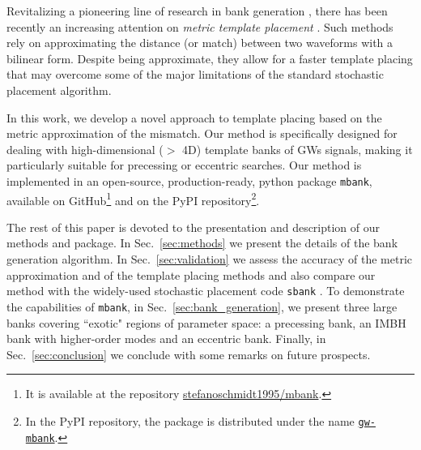 \documentclass[twocolumn,showpacs,preprintnumbers,nofootinbib,prd,
superscriptaddress,10pt]{revtex4-2}
\begin{document}
Revitalizing a pioneering line of research in bank generation \cite{owen_metric, Messenger:2008ta, Prix:2007ks, Brown:2012qf, Keppel:2013uma}, there has been recently an increasing attention on {\it metric template placement} \cite{Roy:2017oul, 2018cosp...42E2899R, Coogan:2022qxs, Hanna:2022zpk}.
Such methods rely on approximating the distance (or match) between two waveforms with a bilinear form. Despite being approximate, they allow for a faster template placing that may overcome some of the major limitations of the standard stochastic placement algorithm.

In this work, we develop a novel approach to template placing based on the metric approximation of the mismatch.
Our method is specifically designed for dealing with high-dimensional ($>$ 4D) template banks of GWs signals, making it particularly suitable for precessing or eccentric searches.
Our method is implemented in an open-source, production-ready, python package \texttt{mbank}, available on GitHub\footnote{
It is available at the repository \href{https://github.com/stefanoschmidt1995/mbank}{stefanoschmidt1995/mbank}.}
and on the PyPI repository\footnote{
In the PyPI repository, the package is distributed under the name \texttt{\href{https://pypi.org/project/gw-mbank/}{gw-mbank}}.
}.


The rest of this paper is devoted to the presentation and description of our methods and package.
In Sec.~\ref{sec:methods} we present the details of the bank generation algorithm.
In Sec.~\ref{sec:validation} we assess the accuracy of the metric approximation and of the template placing methods and also compare our method with the widely-used stochastic placement code \texttt{sbank} \cite{Ajith:2012mn}.
To demonstrate the capabilities of \texttt{mbank}, in Sec.~\ref{sec:bank_generation}, we present three large banks covering ``exotic" regions of parameter space: a precessing bank, an IMBH bank with higher-order modes and an eccentric bank.
Finally, in Sec.~\ref{sec:conclusion} we conclude with some remarks on future prospects.
\end{document}
